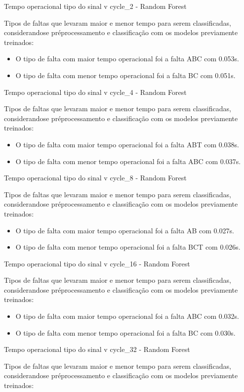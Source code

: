 Tempo operacional tipo do sinal v cycle_2 - Random Forest
\item Tipos de faltas que levaram maior e menor tempo para serem classificadas, considerando\hyph se pré\hyph processamento e classificação com os modelos previamente treinados:
\begin{itemize}
\item O tipo de falta com maior tempo operacional foi a falta ABC com 0.053s.
\item O tipo de falta com menor tempo operacional foi a falta BC com 0.051s.
\end{itemize}
Tempo operacional tipo do sinal v cycle_4 - Random Forest
\item Tipos de faltas que levaram maior e menor tempo para serem classificadas, considerando\hyph se pré\hyph processamento e classificação com os modelos previamente treinados:
\begin{itemize}
\item O tipo de falta com maior tempo operacional foi a falta ABT com 0.038s.
\item O tipo de falta com menor tempo operacional foi a falta ABC com 0.037s.
\end{itemize}
Tempo operacional tipo do sinal v cycle_8 - Random Forest
\item Tipos de faltas que levaram maior e menor tempo para serem classificadas, considerando\hyph se pré\hyph processamento e classificação com os modelos previamente treinados:
\begin{itemize}
\item O tipo de falta com maior tempo operacional foi a falta AB com 0.027s.
\item O tipo de falta com menor tempo operacional foi a falta BCT com 0.026s.
\end{itemize}
Tempo operacional tipo do sinal v cycle_16 - Random Forest
    \item Tipos de faltas que levaram maior e menor tempo para serem classificadas, considerando\hyph se pré\hyph processamento e classificação com os modelos previamente treinados:
    \begin{itemize}
    \item O tipo de falta com maior tempo operacional foi a falta ABC com 0.032s.
    \item O tipo de falta com menor tempo operacional foi a falta BC com 0.030s.
    \end{itemize}
Tempo operacional tipo do sinal v cycle_32 - Random Forest
\item Tipos de faltas que levaram maior e menor tempo para serem classificadas, considerando\hyph se pré\hyph processamento e classificação com os modelos previamente treinados:
